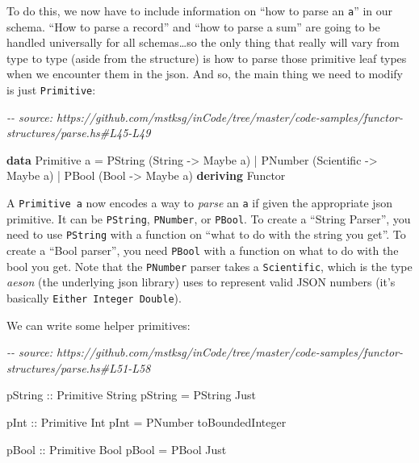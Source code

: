 \documentclass[]{article}
\newenvironment{Shaded}{}{}
\newcommand{\CommentTok}[1]{\textcolor[rgb]{0.38,0.63,0.69}{\textit{#1}}}
\newcommand{\DataTypeTok}[1]{\textcolor[rgb]{0.56,0.13,0.00}{#1}}
\newcommand{\KeywordTok}[1]{\textcolor[rgb]{0.00,0.44,0.13}{\textbf{#1}}}
\newcommand{\NormalTok}[1]{#1}
\newcommand{\OperatorTok}[1]{\textcolor[rgb]{0.40,0.40,0.40}{#1}}
\newcommand{\OtherTok}[1]{\textcolor[rgb]{0.00,0.44,0.13}{#1}}
\begin{document}
To do this, we now have to include information on ``how to parse an \texttt{a}''
in our schema. ``How to parse a record'' and ``how to parse a sum'' are going to
be handled universally for all schemas\ldots so the only thing that really will
vary from type to type (aside from the structure) is how to parse those
primitive leaf types when we encounter them in the json. And so, the main thing
we need to modify is just \texttt{Primitive}:

\begin{Shaded}
\begin{Highlighting}[]
\CommentTok{{-}{-} source: https://github.com/mstksg/inCode/tree/master/code{-}samples/functor{-}structures/parse.hs\#L45{-}L49}

\KeywordTok{data} \DataTypeTok{Primitive}\NormalTok{ a }\OtherTok{=}
      \DataTypeTok{PString}\NormalTok{ (}\DataTypeTok{String} \OtherTok{{-}>} \DataTypeTok{Maybe}\NormalTok{ a)}
    \OperatorTok{|} \DataTypeTok{PNumber}\NormalTok{ (}\DataTypeTok{Scientific} \OtherTok{{-}>} \DataTypeTok{Maybe}\NormalTok{ a)}
    \OperatorTok{|} \DataTypeTok{PBool}\NormalTok{   (}\DataTypeTok{Bool} \OtherTok{{-}>} \DataTypeTok{Maybe}\NormalTok{ a)}
  \KeywordTok{deriving} \DataTypeTok{Functor}
\end{Highlighting}
\end{Shaded}

A \texttt{Primitive\ a} now encodes a way to \emph{parse} an \texttt{a} if given
the appropriate json primitive. It can be \texttt{PString}, \texttt{PNumber}, or
\texttt{PBool}. To create a ``String Parser'', you need to use \texttt{PString}
with a function on ``what to do with the string you get''. To create a ``Bool
parser'', you need \texttt{PBool} with a function on what to do with the bool
you get. Note that the \texttt{PNumber} parser takes a \texttt{Scientific},
which is the type \emph{aeson} (the underlying json library) uses to represent
valid JSON numbers (it's basically \texttt{Either\ Integer\ Double}).

We can write some helper primitives:

\begin{Shaded}
\begin{Highlighting}[]
\CommentTok{{-}{-} source: https://github.com/mstksg/inCode/tree/master/code{-}samples/functor{-}structures/parse.hs\#L51{-}L58}

\OtherTok{pString ::} \DataTypeTok{Primitive} \DataTypeTok{String}
\NormalTok{pString }\OtherTok{=} \DataTypeTok{PString} \DataTypeTok{Just}

\OtherTok{pInt ::} \DataTypeTok{Primitive} \DataTypeTok{Int}
\NormalTok{pInt }\OtherTok{=} \DataTypeTok{PNumber}\NormalTok{ toBoundedInteger}

\OtherTok{pBool ::} \DataTypeTok{Primitive} \DataTypeTok{Bool}
\NormalTok{pBool }\OtherTok{=} \DataTypeTok{PBool} \DataTypeTok{Just}
\end{Highlighting}
\end{Shaded}
\end{document}
